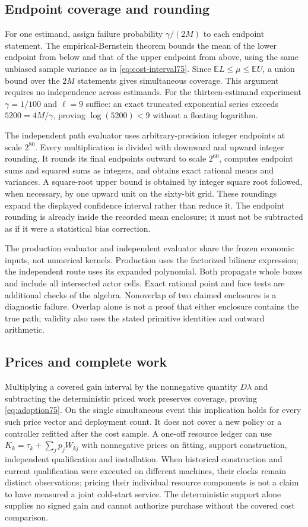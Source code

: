 \subsection{Endpoint coverage and rounding}
For one estimand, assign failure probability $\gamma/(2M)$ to each endpoint statement. The empirical-Bernstein theorem bounds the mean of the lower endpoint from below and that of the upper endpoint from above, using the same unbiased sample variance as in \eqref{eq:cost-interval75}. Since $\mathbb E L\le\mu\le\mathbb E U$, a union bound over the $2M$ statements gives simultaneous coverage. This argument requires no independence across estimands. For the thirteen-estimand experiment $\gamma=1/100$ and $\ell=9$ suffice: an exact truncated exponential series exceeds $5200=4M/\gamma$, proving $\log(5200)<9$ without a floating logarithm.

The independent path evaluator uses arbitrary-precision integer endpoints at scale $2^{80}$. Every multiplication is divided with downward and upward integer rounding. It rounds its final endpoints outward to scale $2^{60}$, computes endpoint sums and squared sums as integers, and obtains exact rational means and variances. A square-root upper bound is obtained by integer square root followed, when necessary, by one upward unit on the sixty-bit grid. These roundings expand the displayed confidence interval rather than reduce it. The endpoint rounding is already inside the recorded mean enclosure; it must not be subtracted as if it were a statistical bias correction.

The production evaluator and independent evaluator share the frozen economic inputs, not numerical kernels. Production uses the factorized bilinear expression; the independent route uses its expanded polynomial. Both propagate whole boxes and include all intersected actor cells. Exact rational point and face tests are additional checks of the algebra. Nonoverlap of two claimed enclosures is a diagnostic failure. Overlap alone is not a proof that either enclosure contains the true path; validity also uses the stated primitive identities and outward arithmetic.

\subsection{Prices and complete work}
Multiplying a covered gain interval by the nonnegative quantity $D\lambda$ and subtracting the deterministic priced work preserves coverage, proving \eqref{eq:adoption75}. On the single simultaneous event this implication holds for every such price vector and deployment count. It does not cover a new policy or a controller refitted after the cost sample. A one-off resource ledger can use $K_k=\tau_k+\sum_jp_jW_{kj}$ with nonnegative prices on fitting, support construction, independent qualification and installation. When historical construction and current qualification were executed on different machines, their clocks remain distinct observations; pricing their individual resource components is not a claim to have measured a joint cold-start service. The deterministic support alone supplies no signed gain and cannot authorize purchase without the covered cost comparison.
